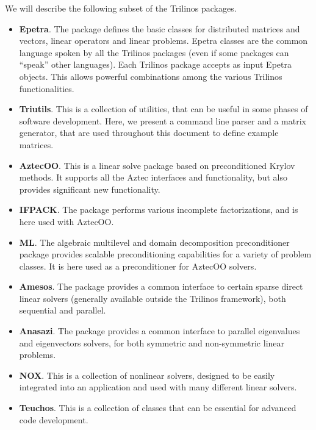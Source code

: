 We will describe the following subset of the Trilinos packages.
\begin{itemize} 
\item {\bf Epetra}. The package defines the basic classes for
  distributed matrices and vectors, linear operators and linear
  problems. Epetra classes are the common language spoken by all the
  Trilinos packages (even if some packages can ``speak'' other
  languages). Each Trilinos package accepts as input Epetra objects.
  This allows powerful combinations among the various Trilinos
  functionalities.
\item {\bf Triutils}. This is a collection of utilities, that can be
  useful in some phases of software development. Here, we present a
  command line parser and a matrix generator, that are used throughout
  this document to define example matrices.
\item {\bf AztecOO}. This is a linear solve package based on
  preconditioned Krylov methods. It supports all the Aztec interfaces
  and functionality, but also provides significant new functionality.
\item {\bf IFPACK}. The package performs various incomplete
  factorizations, and is here used with AztecOO.
\item {\bf ML}. The algebraic multilevel and domain decomposition
  preconditioner package provides scalable preconditioning capabilities
  for a variety of problem classes. It is here used as a preconditioner
  for AztecOO solvers.
\item {\bf Amesos}. The package provides a common interface to certain
  sparse direct linear solvers (generally available outside the Trilinos
  framework), both sequential and parallel.
\item {\bf Anasazi}. The package provides a common interface to
  parallel eigenvalues and eigenvectors solvers, for both symmetric and
  non-symmetric linear problems.
\item {\bf NOX}. This is a collection of nonlinear solvers, designed to
  be easily integrated into an application and used with many different
  linear solvers.
\item {\bf Teuchos}. This is a collection of classes that can be
  essential for advanced code development.
\end{itemize}

